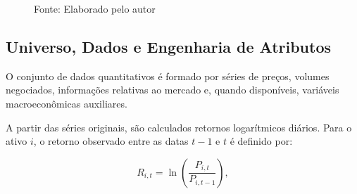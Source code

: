 \begin{figure}[htbp]
{%
    }
    
    \par\smallskip
    Fonte: Elaborado pelo autor
\end{figure}

\subsection{Universo, Dados e Engenharia de Atributos}
\label{subsec:universo_dados}

O conjunto de dados quantitativos é formado por séries de preços, volumes negociados, informações relativas ao mercado e, quando disponíveis, variáveis macroeconômicas auxiliares.

A partir das séries originais, são calculados retornos logarítmicos diários. Para o ativo $i$, o retorno observado entre as datas $t-1$ e $t$ é definido por:

\begin{equation}
    R_{i,t}
    =
    \ln\left(
        \frac{P_{i,t}}{P_{i,t-1}}
    \right),
    \label{eq:retorno_logaritmico}
\end{equation}

